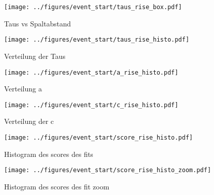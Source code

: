 \begin{figure}[H]
    \centering
    \begin{minipage}[t]{0.44\textwidth}
        \centering
        \texttt{[image: ../figures/event\_start/taus\_rise\_box.pdf]}
        \caption{Taus vs Spaltabstand}
        \label{fig:taus_rise_box}
    \end{minipage}
    \hfill
    \begin{minipage}[t]{0.44\textwidth}
        \centering
        \texttt{[image: ../figures/event\_start/taus\_rise\_histo.pdf]}
        \caption{Verteilung der Taus}
        \label{fig:taus_rise_histo}
    \end{minipage}
\end{figure}


\begin{figure}[H]
    \centering
    \begin{minipage}[t]{0.44\textwidth}
        \centering
        \texttt{[image: ../figures/event\_start/a\_rise\_histo.pdf]}
        \caption{Verteilung a}
        \label{fig:a_rise_histo}
    \end{minipage}
    \hfill
    \begin{minipage}[t]{0.44\textwidth}
        \centering
        \texttt{[image: ../figures/event\_start/c\_rise\_histo.pdf]}
        \caption{Verteilung der c}
        \label{fig:c_rise_histo}
    \end{minipage}
\end{figure}





\begin{figure}[H]
    \centering
    \begin{minipage}[t]{0.44\textwidth}
        \centering
        \texttt{[image: ../figures/event\_start/score\_rise\_histo.pdf]}
        \caption{Histogram des scores des fits}
        \label{fig:score_rise_histo}
    \end{minipage}
    \hfill
    \begin{minipage}[t]{0.44\textwidth}
        \centering
        \texttt{[image: ../figures/event\_start/score\_rise\_histo\_zoom.pdf]}
        \caption{Histogram des scores des fit zoom}
        \label{fig:score_rise_histo_zoom}
    \end{minipage}
\end{figure}


